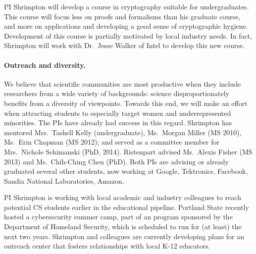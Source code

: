 PI Shrimpton will develop a course in cryptography
suitable for undergraduates.  This course will focus less on proofs and
formalisms than his graduate course, and more on applications and developing a good sense of
cryptographic hygiene.  Development of this course is partially
motivated by local industry needs.
In fact, Shrimpton will work with Dr.\ Jesse Walker of Intel to develop this new course.

\paragraph{Outreach and diversity.} We believe that scientific
communities are most productive when they include researchers from a wide
variety of backgrounds: science disproportionately benefits from a diversity of
viewpoints.  Towards this end,  we will make an effort when attracting students
to especially target women and underrepresented minorities.  The PIs have
already had success in this regard.  Shrimpton has mentored Mrs.\ Tashell
Kelly (undergraduate), 
Ms.\ Morgan Miller (MS 2010), Ms.\ Erin Chapman (MS 2012); 
and served as a committee member for Mrs.\ Nichole Schimanski (PhD, 2014).
Ristenpart advised Ms.\ Alexis Fisher (MS 2013)
and Ms.\ Chih-Ching Chen (PhD). %
Both PIs are advising or already graduated several other students, now working
at Google, Tektronics, Facebook, Sandia National Laboratories, Amazon. 

PI Shrimpton is working with local academic and industry colleagues 
to reach potential CS students earlier in the educational pipeline.  Portland
State recently hosted a cybersecurity summer camp, part of an program
sponsored by the Department of Homeland Security, which is scheduled
to run for (at least) the next two years.  Shrimpton and colleagues
are currently developing plans for an outreach center that fosters 
relationships with local K-12 educators. 


